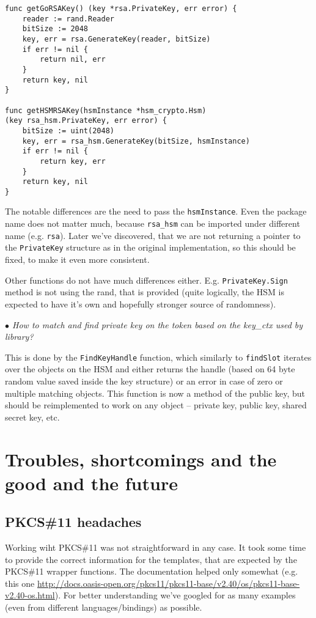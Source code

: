 \documentclass[a4paper]{scrartcl}
\begin{document}
\begin{lstlisting}[caption=Initialization of the HSM, captionpos=b, label={lst:rsaComp}]
func getGoRSAKey() (key *rsa.PrivateKey, err error) {
    reader := rand.Reader
    bitSize := 2048
    key, err = rsa.GenerateKey(reader, bitSize)
    if err != nil {
        return nil, err
    }
    return key, nil
}

func getHSMRSAKey(hsmInstance *hsm_crypto.Hsm)
(key rsa_hsm.PrivateKey, err error) {
    bitSize := uint(2048)
    key, err = rsa_hsm.GenerateKey(bitSize, hsmInstance)
    if err != nil {
        return key, err
    }
    return key, nil
}
\end{lstlisting}

The notable differences are the need to pass the \lstinline[columns=fixed]{hsmInstance}. Even the package name does not matter much, because \lstinline[columns=fixed]{rsa_hsm} can be imported under different name (e.g. \lstinline[columns=fixed]{rsa}). Later we've discovered, that we are not returning a pointer to the \lstinline[columns=fixed]{PrivateKey} structure as in the original implementation, so this should be fixed, to make it even more consistent.

Other functions do not have much differences either. E.g. \lstinline[columns=fixed]{PrivateKey.Sign} method is not using the rand, that is provided (quite logically, the HSM is expected to have it's own and hopefully stronger source of randomness).

\textit{$\bullet$ How to match and find private key on the token based on the key\_ctx used by library?}

This is done by the \lstinline[columns=fixed]{FindKeyHandle} function, which similarly to \lstinline[columns=fixed]{findSlot} iterates over the objects on the HSM and either returns the handle (based on 64 byte random value saved inside the key structure) or an error in case of zero or multiple matching objects. This function is now a method of the public key, but should be reimplemented to work on any object -- private key, public key, shared secret key, etc.

\section{Troubles, shortcomings and the good and the future}

\subsection{PKCS\#11 headaches}
Working wiht PKCS\#11 was not straightforward in any case. It took some time to provide the correct information for the templates, that are expected by the PKCS\#11 wrapper functions. The documentation helped only somewhat (e.g. this one \url{http://docs.oasis-open.org/pkcs11/pkcs11-base/v2.40/os/pkcs11-base-v2.40-os.html}). For better understanding we've googled for as many examples (even from different languages/bindings) as possible.
\end{document}
